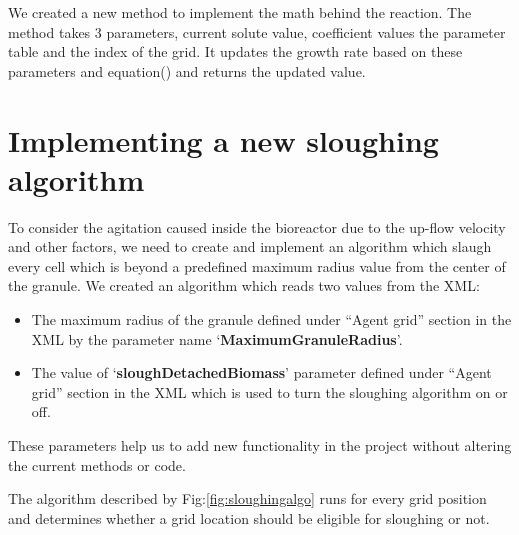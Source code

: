 We created a new method to implement the math behind the reaction. The method takes 3 parameters, current solute value, coefficient values the parameter table and the index of the grid. It updates the growth rate based on these parameters and equation() and returns the updated value.

\section{Implementing a new sloughing algorithm}

To consider the agitation caused inside the bioreactor due to the up-flow velocity and other factors, we need to create and implement an algorithm which slaugh every cell which is beyond a predefined maximum radius value from the center of the granule. We created an algorithm which reads two values from the XML:

\begin{itemize}
\item The maximum radius of the granule defined under “Agent grid” section in the XML by the parameter name ‘\textbf{MaximumGranuleRadius}’.
\item The value of ‘\textbf{sloughDetachedBiomass}’ parameter defined under “Agent grid” section in the XML which is used to turn the sloughing algorithm on or off.
\end{itemize}
These parameters help us to add new functionality in the project without altering the current methods or code.

The algorithm described by Fig:\ref{fig:sloughingalgo} runs for every grid position and determines whether a grid location should be eligible for  sloughing or not.

